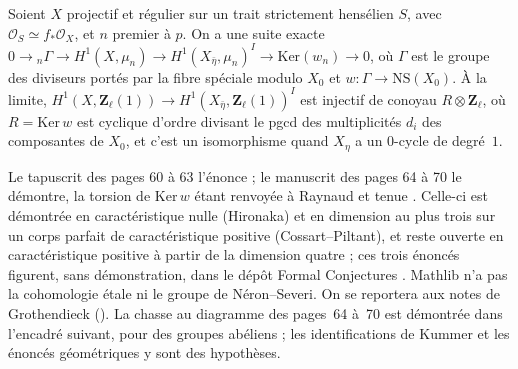 \begin{encadre}
\begin{theoreme*}\nonverifie
Soient $X$ projectif et régulier sur un trait strictement hensélien $S$, avec $\mathcal O_S \simeq f_*\mathcal O_X$, et $n$ premier à $p$. On a une suite exacte $0 \to {}_n\Gamma \to H^1(X, \mu_n) \to H^1(X_{\bar\eta}, \mu_n)^I \to \mathrm{Ker}(w_n) \to 0$, où $\Gamma$ est le groupe des diviseurs portés par la fibre spéciale modulo $X_0$ et $w : \Gamma \to \mathrm{NS}(X_0)$. À la limite, $H^1(X, \mathbf Z_\ell(1)) \to H^1(X_{\bar\eta}, \mathbf Z_\ell(1))^I$ est injectif de conoyau $R \otimes \mathbf Z_\ell$, où $R = \mathrm{Ker}\,w$ est cyclique d'ordre divisant le pgcd des multiplicités $d_i$ des composantes de $X_0$, et c'est un isomorphisme quand $X_\eta$ a un $0$-cycle de degré~$1$.
\end{theoreme*}
\end{encadre}
{\small Le tapuscrit des pages 60 à 63 l'énonce ; le manuscrit des pages 64 à 70 le démontre, la torsion de $\mathrm{Ker}\,w$ étant renvoyée à Raynaud et tenue . Celle-ci est démontrée en caractéristique nulle (Hironaka) et en dimension au plus trois sur un corps parfait de caractéristique positive (Cossart--Piltant), et reste ouverte en caractéristique positive à partir de la dimension quatre ; ces trois énoncés figurent, sans démonstration, dans le dépôt Formal Conjectures \cite{formalconjectures}. Mathlib n'a pas la cohomologie étale ni le groupe de Néron--Severi. On se reportera aux notes de Grothendieck (). La chasse au diagramme des pages~64 à~70 est démontrée dans l'encadré suivant, pour des groupes abéliens ; les identifications de Kummer et les énoncés géométriques y sont des hypothèses.\par}

